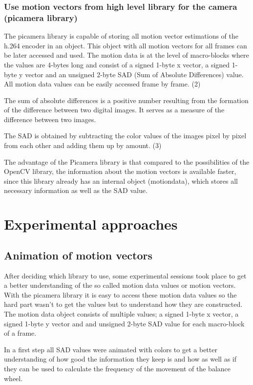 \documentclass[12pt, a4paper]{report}
\begin{document}
\subsection{Use motion vectors from high level library for the camera (picamera library)}
The picamera library is capable of storing all motion vector estimations of the h.264 encoder in an object. This object with all motion vectors for all frames can be later accessed and used. The motion data is at the level of macro-blocks where the values are 4-bytes long and consist of a signed 1-byte x vector, a signed 1-byte y vector and an unsigned 2-byte SAD (Sum of Absolute Differences) value. All motion data values can be easily accessed frame by frame. (2) 

The sum of absolute differences is a positive number resulting from the formation of the difference between two digital images. It serves as a measure of the difference between two images.

The SAD is obtained by subtracting the color values of the images pixel by pixel from each other and adding them up by amount. (3)

The advantage of the Picamera library is that compared to the possibilities of the OpenCV library, the information about the motion vectors is available faster, since this library already has an internal object (motiondata), which stores all necessary information as well as the SAD value. 

\chapter {Experimental approaches}
\section{Animation of motion vectors}
After deciding which library to use, some experimental sessions took place to get a better understanding of the so called motion data values or motion vectors. 
With the picamera library it is easy to access these motion data values so the hard part wasn't to get the values but to understand how they are constructed. 
The motion data object consists of multiple values; a signed 1-byte x vector, a signed 1-byte y vector and and unsigned 2-byte SAD value for each macro-block of a frame.

In a first step all SAD values were animated with colors to get a better understanding of how good the information they keep is and how as well as if they can be used to calculate the frequency of the movement of the balance wheel.
\end{document}
